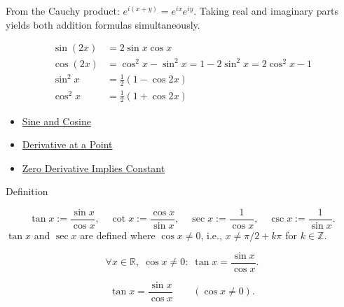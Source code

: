 \begin{remark*}[Interpretation]
From the Cauchy product: $e^{i(x+y)} = e^{ix}e^{iy}$. Taking real
and imaginary parts yields both addition formulas simultaneously.


\begin{align*}
  \sin(2x) &= 2\sin x \cos x \\
  \cos(2x) &= \cos^2 x - \sin^2 x = 1 - 2\sin^2 x = 2\cos^2 x - 1 \\
  \sin^2 x &= \tfrac{1}{2}(1 - \cos 2x) \\
  \cos^2 x &= \tfrac{1}{2}(1 + \cos 2x)
\end{align*}
\end{remark*}

\begin{dependencies}
\begin{itemize}
  \item \hyperref[def:sine-cosine]{Sine and Cosine}
  \item \hyperref[def:derivative-at-a-point]{Derivative at a Point}
  \item \hyperref[thm:zero-derivative-implies-constant]{Zero Derivative Implies Constant}
\end{itemize}
\end{dependencies}


\begin{definitionbox}{Definition}
\begin{definition}
\label{def:other-trig}
\[
  \tan x := \frac{\sin x}{\cos x},\quad
  \cot x := \frac{\cos x}{\sin x},\quad
  \sec x := \frac{1}{\cos x},\quad
  \csc x := \frac{1}{\sin x}.
\]
$\tan x$ and $\sec x$ are defined where $\cos x \neq 0$,
i.e., $x \neq \pi/2 + k\pi$ for $k \in \mathbb{Z}$.
\end{definition}
\end{definitionbox}

\begin{remark*}
\[
  \forall x\in\mathbb{R},\;\cos x\neq 0:\;
  \tan x = \frac{\sin x}{\cos x}.
\]
\end{remark*}

\begin{remark*}
\[
  \tan x=\frac{\sin x}{\cos x}
  \qquad(\cos x\neq0).
\]
\end{remark*}

